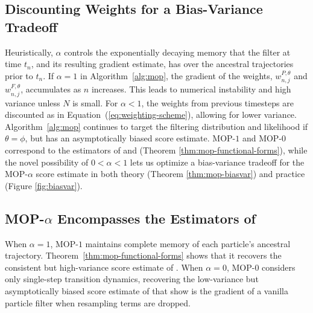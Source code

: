 \documentclass[numsec,webpdf,modern,medium,namedate]{oup-authoring-template}
\newcommand\arxiv[2]{#2} %
\theoremstyle{thmstyleone}%
\theoremstyle{thmstyletwo}%
\theoremstyle{thmstylethree}%
\begin{document}


\arxiv{}{\vspace*{-2mm}}
\subsection{Discounting Weights for a Bias-Variance Tradeoff}

Heuristically, $\alpha$ controls the exponentially decaying memory that the filter at time $t_n$, and its resulting gradient estimate, has over the ancestral trajectories prior to $t_n$. If $\alpha=1$ in Algorithm~\ref{alg:mop}, the gradient of the weights, $w^{P,\theta}_{n,j}$ and $w^{F,\theta}_{n,j}$, accumulates as $n$ increases.
This leads to numerical instability and high variance unless $N$ is small.
For $\alpha<1$, the weights from previous timesteps are discounted as in Equation~(\ref{eq:weighting-scheme}), allowing for lower variance. Algorithm~\ref{alg:mop} continues to target the filtering distribution and likelihood if $\theta=\phi$, but has an asymptotically biased score estimate.
MOP-$1$ and MOP-$0$ correspond to the estimators of \cite{poyiadjis11} and \cite{naesseth18} (Theorem \ref{thm:mop-functional-forms}), while the novel possibility of $0<\alpha<1$ lets us optimize a bias-variance tradeoff for the MOP-$\alpha$ score estimate in both theory (Theorem \ref{thm:mop-biasvar}) and practice (Figure \ref{fig:biasvar}). 


\arxiv{}{\vspace*{-2mm}}
\subsection{MOP-$\alpha$ Encompasses the Estimators of \citep{poyiadjis11, scibior21, naesseth18}}

When $\alpha=1$, MOP-$1$ maintains complete memory of each particle's ancestral trajectory. Theorem~\ref{thm:mop-functional-forms} shows that it recovers the consistent but high-variance score estimate of \cite{poyiadjis11}. 
When $\alpha=0$, MOP-$0$ considers only single-step transition dynamics, recovering the low-variance but asymptotically biased score estimate of \cite{naesseth18} that \cite{scibior21} show is the gradient of a vanilla particle filter when resampling terms are dropped. 
\end{document}
